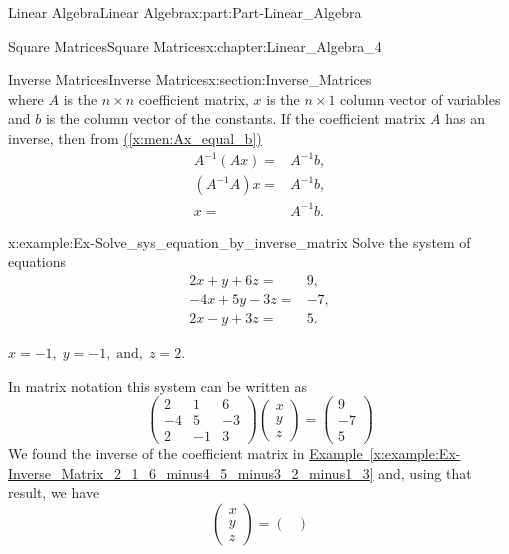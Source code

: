 \documentclass[oneside,10pt,]{book}
\newcommand{\xreffont}{\relax}
\numberwithin{equation}{section}
\newcommand{\amp}{&}
\begin{document}
\begin{partptx}{Linear Algebra}{}{Linear Algebra}{}{}{x:part:Part-Linear_Algebra}
\begin{chapterptx}{Square Matrices}{}{Square Matrices}{}{}{x:chapter:Linear_Algebra_4}
\begin{sectionptx}{Inverse Matrices}{}{Inverse Matrices}{}{}{x:section:Inverse_Matrices}
\begin{equation}
\end{equation}
where \(A \) is the \(n\times n \) coefficient matrix, \(x \) is the \(n\times 1 \)  column vector of variables and \(b \) is the column vector of the constants. If the coefficient matrix \(A \) has an inverse, then from  \hyperref[x:men:Ax_equal_b]{({\xreffont\ref{x:men:Ax_equal_b}})}%
\begin{align*}
A^{-1}(Ax)= \amp A^{-1}b,\\
(A^{-1}A)x= \amp A^{-1}b,\\
x= \amp A^{-1}b.
\end{align*}
\begin{example}{}{x:example:Ex-Solve_sys_equation_by_inverse_matrix}%
Solve the system of equations%
\begin{align*}
2x + y + 6z = \amp 9,\\
-4x + 5y - 3z = \amp -7,\\
2x - y + 3z = \amp 5.
\end{align*}
%
\par\smallskip%
\noindent\hypertarget{g:answer:id572048}{}\(x=-1, \; y=-1,\; \text{and}, \; z=2. \)%
\par\smallskip%
\noindent\hypertarget{g:solution:id572042}{}In matrix notation this system can be written as%
\begin{equation*}
\begin{pmatrix}
2 \amp 1 \amp 6  \\
-4 \amp 5 \amp -3 \\
2 \amp -1 \amp  3 
\end{pmatrix}
\begin{pmatrix}
x \\
y \\
z
\end{pmatrix}=
\begin{pmatrix}
9 \\
-7 \\
5
\end{pmatrix}
\end{equation*}
We found the inverse of the coefficient matrix in \hyperref[x:example:Ex-Inverse_Matrix_2_1_6_minus4_5_minus3_2_minus1_3]{Example~{\xreffont\ref{x:example:Ex-Inverse_Matrix_2_1_6_minus4_5_minus3_2_minus1_3}}} and, using that result, we have%
\begin{equation*}
\begin{pmatrix}
x \\
y \\
z
\end{pmatrix}=
\begin{pmatrix}

\end{pmatrix}
\end{equation*}
\end{example}
\end{sectionptx}
\end{chapterptx}
\end{partptx}
\end{document}
